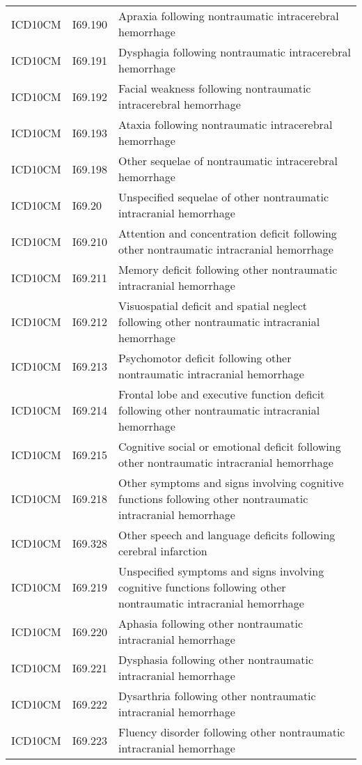\begin{longtable}{p{}p{}p{}}
  ICD10CM & I69.190 & Apraxia following nontraumatic intracerebral hemorrhage \\ 
  ICD10CM & I69.191 & Dysphagia following nontraumatic intracerebral hemorrhage \\ 
  ICD10CM & I69.192 & Facial weakness following nontraumatic intracerebral hemorrhage \\ 
  ICD10CM & I69.193 & Ataxia following nontraumatic intracerebral hemorrhage \\ 
  ICD10CM & I69.198 & Other sequelae of nontraumatic intracerebral hemorrhage \\ 
  ICD10CM & I69.20 & Unspecified sequelae of other nontraumatic intracranial hemorrhage \\ 
  ICD10CM & I69.210 & Attention and concentration deficit following other nontraumatic intracranial hemorrhage \\ 
  ICD10CM & I69.211 & Memory deficit following other nontraumatic intracranial hemorrhage \\ 
  ICD10CM & I69.212 & Visuospatial deficit and spatial neglect following other nontraumatic intracranial hemorrhage \\ 
  ICD10CM & I69.213 & Psychomotor deficit following other nontraumatic intracranial hemorrhage \\ 
  ICD10CM & I69.214 & Frontal lobe and executive function deficit following other nontraumatic intracranial hemorrhage \\ 
  ICD10CM & I69.215 & Cognitive social or emotional deficit following other nontraumatic intracranial hemorrhage \\ 
  ICD10CM & I69.218 & Other symptoms and signs involving cognitive functions following other nontraumatic intracranial hemorrhage \\ 
  ICD10CM & I69.328 & Other speech and language deficits following cerebral infarction \\ 
  ICD10CM & I69.219 & Unspecified symptoms and signs involving cognitive functions following other nontraumatic intracranial hemorrhage \\ 
  ICD10CM & I69.220 & Aphasia following other nontraumatic intracranial hemorrhage \\ 
  ICD10CM & I69.221 & Dysphasia following other nontraumatic intracranial hemorrhage \\ 
  ICD10CM & I69.222 & Dysarthria following other nontraumatic intracranial hemorrhage \\ 
  ICD10CM & I69.223 & Fluency disorder following other nontraumatic intracranial hemorrhage \\ 

\end{longtable}
